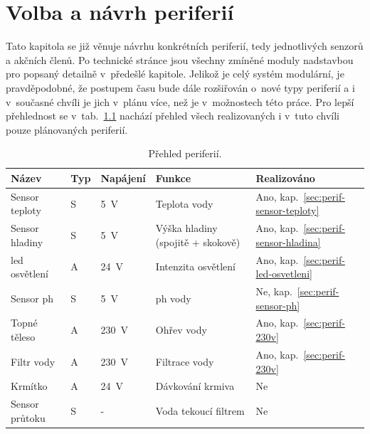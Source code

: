 \chapter{Volba a návrh periferií}
    Tato kapitola se již věnuje návrhu konkrétních periferií, tedy jednotlivých senzorů a akčních členů. Po technické stránce jsou všechny zmíněné moduly nadstavbou pro  popsaný detailně v~předešlé kapitole. Jelikož je celý systém modulární, je pravděpodobné, že postupem času bude dále rozšiřován o~nové typy periferií a i v~současné chvíli je jich v~plánu více, než je v~možnostech této práce. Pro lepší přehlednost se v~tab.~\ref{tab:prehled-periferii} nachází přehled všech realizovaných i v~tuto chvíli pouze plánovaných periferií.

    \begin{table}[h]
        \centering
        \caption{Přehled periferií.}
        \label{tab:prehled-periferii}
        \begin{tabular}{|l|l|l|l|l|}
            \hline
            Název & Typ & Napájení & Funkce & Realizováno \\ \hline\hline
            Sensor teploty  & S~& \qty{5}{V}    & Teplota vody                       & Ano, kap.~\ref{sec:perif-sensor-teploty}  \\ \hline
            Sensor hladiny  & S~& \qty{5}{V}    & Výška hladiny (spojitě + skokově)  & Ano, kap.~\ref{sec:perif-sensor-hladina}  \\ \hline
            \acs{led} osvětlení   & A~& \qty{24}{V}   & Intenzita osvětlení                & Ano, kap.~\ref{sec:perif-led-osvetleni}  \\ \hline
            Sensor \acs{ph}       & S~& \qty{5}{V}    & \acs{ph} vody                            & Ne, kap.~\ref{sec:perif-sensor-ph}  \\ \hline
            Topné těleso    & A~& \qty{230}{V}  & Ohřev vody                         & Ano, kap.~\ref{sec:perif-230v}  \\ \hline
            Filtr vody      & A~& \qty{230}{V}  & Filtrace vody                      & Ano, kap.~\ref{sec:perif-230v}  \\ \hline
            Krmítko         & A~& \qty{24}{V}   & Dávkování krmiva                   & Ne  \\ \hline
            Sensor průtoku  & S~& -             & Voda tekoucí filtrem               & Ne  \\ \hline

\end{tabular}
\end{table}
